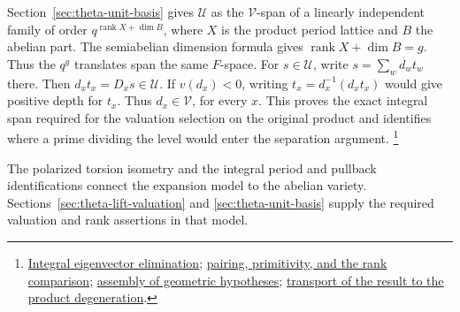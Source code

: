Section~\ref{sec:theta-unit-basis} gives \(\mathcal U\)
as the \(\mathcal V\)-span of a linearly independent family of order
\(q^{\operatorname{rank}X+\dim B}\), where \(X\) is the product
period lattice and \(B\) the abelian part. The semiabelian dimension
formula gives \(\operatorname{rank}X+\dim B=g\). Thus the \(q^g\)
translates span the same \(F\)-space. For \(s\in\mathcal U\),
write \(s=\sum_w d_wt_w\) there. Then \(d_xt_x=D_xs\in\mathcal U\).
If \(v(d_x)<0\), writing \(t_x=d_x^{-1}(d_xt_x)\) would give
positive depth for \(t_x\). Thus \(d_x\in\mathcal V\), for every \(x\).
This proves the exact integral span required for the valuation
selection on the original product and identifies where a prime
dividing the level would enter the separation argument.
\footnote{\href{https://github.com/ChristianKudeba/alpoge-rh-verification/blob/alpoge-source-7cbf7a0c/src/ReciprocityTheory/ReductiveGroups/ArithmeticGeometry/FirstCohomology/IntegralRingEmbedding.lean}{Integral eigenvector elimination};
\href{https://github.com/ChristianKudeba/alpoge-rh-verification/blob/alpoge-source-7cbf7a0c/src/ReciprocityTheory/ReductiveGroups/ArithmeticGeometry/FirstCohomology/OneCPf.lean}{pairing, primitivity, and the rank comparison};
\href{https://github.com/ChristianKudeba/alpoge-rh-verification/blob/alpoge-source-7cbf7a0c/src/ReciprocityTheory/ReductiveGroups/ArithmeticGeometry/FirstCohomology/CmLiftConditionOfLaws.lean}{assembly of geometric hypotheses};
\href{https://github.com/ChristianKudeba/alpoge-rh-verification/blob/alpoge-source-7cbf7a0c/src/Development/AbelianVarietyTheory/Proofs/JetHarmonics/ExistsTermLe.lean}{transport of the result to the product degeneration}.}

The polarized torsion isometry and the integral period and pullback
identifications connect the expansion model to the abelian variety.
Sections~\ref{sec:theta-lift-valuation} and \ref{sec:theta-unit-basis}
supply the required valuation and rank assertions in that model.
